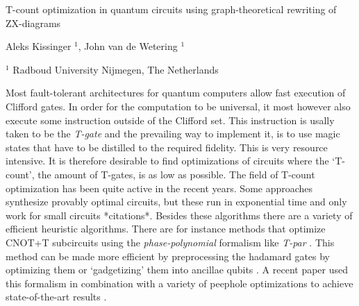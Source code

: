 \documentclass[a4paper,11pt]{article}
\begin{document}

\Large
 \begin{center}
T-count optimization in quantum circuits using graph-theoretical rewriting of ZX-diagrams\\ 

\hspace{10pt}

\normalsize
Aleks Kissinger $^1$, John van de Wetering $^1$ \\

\hspace{10pt}

\small  
$^1$ Radboud University Nijmegen, The Netherlands


\end{center}

\hspace{10pt}

\normalsize

\noindent

Most fault-tolerant architectures for quantum computers allow fast execution of Clifford gates. In order for the computation to be universal, it most however also execute some instruction outside of the Clifford set. This instruction is usally taken to be the \emph{T-gate} and the prevailing way to implement it, is to use magic states that have to be distilled to the required fidelity. This is very resource intensive. It is therefore desirable to find optimizations of circuits where the `T-count', the amount of T-gates, is as low as possible. The field of T-count optimization has been quite active in the recent years. Some approaches synthesize provably optimal circuits, but these run in exponential time and only work for small circuits *citations*. Besides these algorithms there are a variety of efficient heuristic algorithms. There are for instance methods that optimize CNOT+T subcircuits using the \emph{phase-polynomial} formalism like \emph{T-par} \cite{amy2014polynomial}. This method can be made more efficient by preprocessing the hadamard gates by optimizing them \cite{abdessaied2014quantum} or `gadgetizing' them into ancillae qubits \cite{heyfron2018efficient}. A recent paper used this formalism in combination with a variety of peephole optimizations to achieve state-of-the-art results \cite{nam2018automated}.
\end{document}
